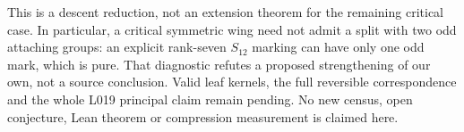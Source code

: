 \documentclass[11pt,a4paper]{article}
\begin{document}
This is a descent reduction, not an extension theorem for the
remaining critical case. In particular, a critical symmetric wing
need not admit a split with two odd attaching groups: an explicit
rank-seven $S_{12}$ marking can have only one odd mark, which is
pure. That diagnostic refutes a proposed strengthening of our own,
not a source conclusion. Valid leaf kernels, the full reversible
correspondence and the whole L019 principal claim remain pending.
No new census, open conjecture, Lean theorem or compression
measurement is claimed here.
\end{document}
